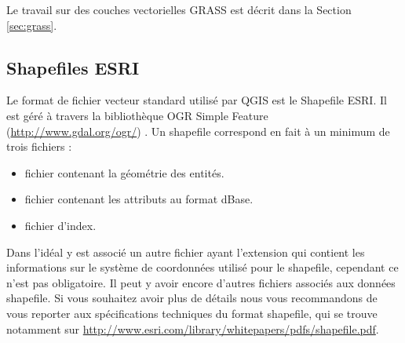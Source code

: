 Le travail sur des couches vectorielles GRASS est décrit dans la Section \ref{sec:grass}.

\subsection{Shapefiles ESRI}

Le format de fichier vecteur standard utilisé par QGIS est le Shapefile ESRI. Il est géré à travers la bibliothèque OGR Simple Feature  (\url{http://www.gdal.org/ogr/}) . Un shapefile correspond en fait à un minimum de trois fichiers : 

\begin{itemize}
\item {} fichier contenant la géométrie des entités.
\item {} fichier contenant les attributs au format dBase.
\item {} fichier d'index.
\end{itemize}

Dans l'idéal y est associé un autre fichier ayant l'extension  qui contient les informations sur le système de coordonnées utilisé pour le shapefile, cependant ce n'est pas obligatoire. Il peut y avoir encore d'autres fichiers associés aux données shapefile. Si vous souhaitez avoir plus de détails nous vous recommandons de vous reporter aux spécifications techniques du format shapefile, qui se trouve notamment sur \url{http://www.esri.com/library/whitepapers/pdfs/shapefile.pdf}.


